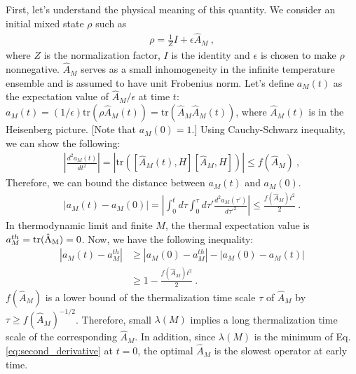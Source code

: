 \documentclass[twocolumn,superscriptaddress, prb]{revtex4-1}
\begin{document}
First, let's understand the physical meaning of this quantity.
We consider an initial mixed state $\rho$ such as
\begin{align}\label{eq:initial}
\rho = \frac{1}{Z}I + \epsilon\hat{A}_M ~,
\end{align}
where $Z$ is the normalization factor, $I$ is the identity and $\epsilon$ is chosen to make $\rho$ nonnegative.
$\hat{A}_M$ serves as a small inhomogeneity in the infinite temperature ensemble and
is assumed to have unit Frobenius norm.
Let's define $a_M(t)$ as the expectation value of $\hat{A}_M/\epsilon$ at time $t$:
$a_M(t) = (1/\epsilon)\mathrm{tr}(\rho \hat{A}_M(t)) = \mathrm{tr}(\hat{A}_M \hat{A}_M(t))$,
where $\hat{A}_M(t)$ is in the Heisenberg picture. [Note that $a_M(0) = 1$.]
Using Cauchy-Schwarz inequality, we can show the following:
\begin{align}
\left|\frac{d^2 a_M(t)}{dt^2}\right| = |\mathrm{tr}([\hat{A}_M(t),H][\hat{A}_M,H])| \leq f(\hat{A}_M) ~,
\label{eq:second_derivative}
\end{align}
Therefore, we can bound the distance between $a_M(t)$ and $a_M(0)$.
\begin{align}
|a_M(t) - a_M(0)| = \left|\int^t_0 d\tau \int^\tau_0 d\tau' \frac{d^2 a_M(\tau')}{d\tau'^2}\right| \leq \frac{f(\hat{A}_M) t^2}{2} ~.
\end{align}
In thermodynamic limit and finite $M$, the thermal expectation value is
$a_M^{th} = \rm{tr}(\hat{A}_M) = 0$.
Now, we have the following inequality:
\begin{align}
|a_M(t) - a_M^{th}| &\geq |a_M(0) - a_M^{th}| - |a_M(0) - a_M(t)| \nonumber\\
& \geq 1 - \frac{f(\hat{A}_M)t^2}{2} ~.
\label{eq:hamiltonian_timescale}
\end{align}
$f(\hat{A}_M)$ is a lower bound of the thermalization time scale $\tau$ of $\hat{A}_M$ by $\tau \geq f(\hat{A}_M)^{-1/2}$.
Therefore, small $\lambda(M)$ implies a long thermalization time scale of the corresponding $\hat{A}_M$.
In addition, since $\lambda(M)$ is the minimum of Eq. \eqref{eq:second_derivative} at $t =0$,
the optimal $\hat{A}_M$ is the slowest operator at early time.

\end{document}
